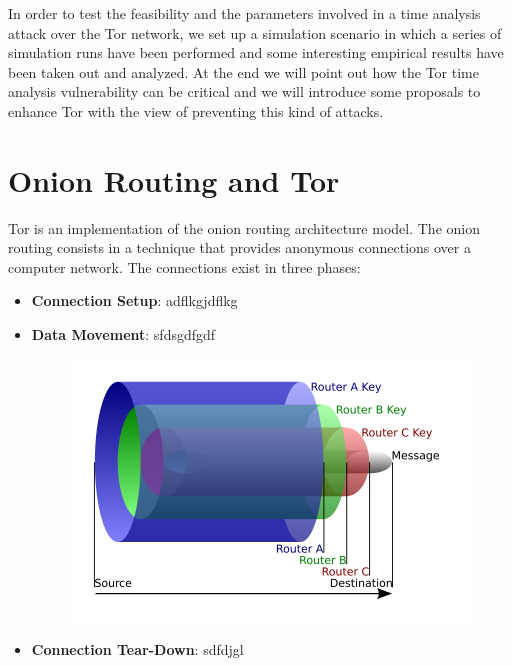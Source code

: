 \documentclass[a4paper]{article}
\begin{document}
In order to test the feasibility and the parameters involved in
a time analysis attack over the Tor network, we set up a simulation
scenario in which a series of simulation runs have been performed and some interesting
empirical results have been taken out and analyzed.
At the end we will point out how the Tor time analysis vulnerability can be
critical and we will introduce some proposals to enhance Tor with the
view of preventing this kind of attacks. %


\section{Onion Routing and Tor}
\label{sec:tor}
Tor is an implementation of the onion routing architecture model. The
onion routing consists in a technique that provides anonymous
connections over a computer network\cite{or}.
The connections exist in three phases:
\begin{itemize}
	\item \textbf{Connection Setup}: adflkgjdflkg
	\item \textbf{Data Movement}: sfdsgdfgdf
		\begin{figure}[H]
			\centering
			\includegraphics[scale=0.35]{onion.png}
			\label{fig:onion}
		\end{figure}	
	\item \textbf{Connection Tear-Down}: sdfdjgl
\end{itemize}
\end{document}
